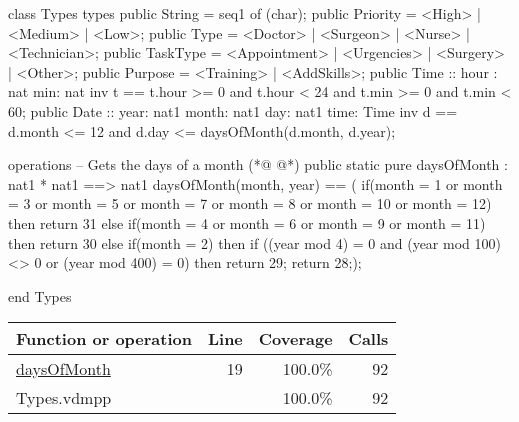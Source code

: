 \begin{vdmpp}[breaklines=true]
class Types
types
 public String = seq1 of (char);
 public Priority = <High> | <Medium> | <Low>;
 public Type = <Doctor> | <Surgeon> | <Nurse> | <Technician>;
 public TaskType = <Appointment> | <Urgencies> | <Surgery> | <Other>;
 public Purpose = <Training> | <AddSkills>;
 public Time :: hour : nat
         min: nat
 inv t == t.hour >= 0 and t.hour < 24 and t.min >= 0 and t.min < 60;
 public Date ::  year: nat1
         month: nat1
         day: nat1
         time: Time
 inv d == d.month <= 12 and d.day <= daysOfMonth(d.month, d.year);
 
operations
 -- Gets the days of a month
(*@
\label{daysOfMonth:19}
@*)
 public static pure daysOfMonth : nat1 * nat1 ==> nat1
  daysOfMonth(month, year) == (
              if(month = 1 or month = 3 or month = 5 or month = 7 or month = 8 or month = 10 or month = 12)
               then return 31
              else if(month = 4 or month = 6 or month = 9 or month = 11)
               then return 30
              else if(month = 2)
               then if ((year mod 4) = 0 and (year mod 100) <> 0 or (year mod 400) = 0)
                then return 29;
              return 28;);
                
end Types
\end{vdmpp}
\bigskip
\begin{longtable}{|l|r|r|r|}
\hline
Function or operation & Line & Coverage & Calls \\
\hline
\hline
\hyperref[daysOfMonth:19]{daysOfMonth} & 19&100.0\% & 92 \\
\hline
\hline
Types.vdmpp & & 100.0\% & 92 \\
\hline
\end{longtable}

